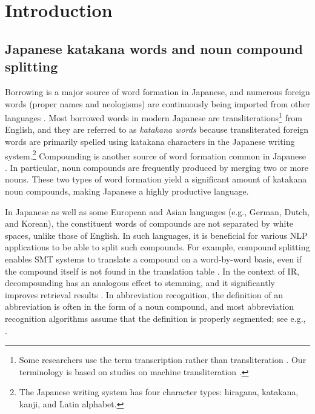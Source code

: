 \documentclass[english]{jnlp_1.4_rep}
\begin{document}
\maketitle

\section{Introduction} \label{sec:intro}

\subsection{Japanese katakana words and noun compound splitting}

Borrowing is a major source of word formation in Japanese, and numerous
foreign words (proper names and neologisms) are continuously being
imported from other languages \cite{Tsujimura06}. Most borrowed words in
modern Japanese are transliterations\footnote{Some researchers use the term transcription rather
than transliteration \cite{Breen09}. Our terminology is based on studies
on machine transliteration \cite{Knight98}.} 
from English, and they are referred to as {\it katakana words} because
transliterated foreign words are primarily spelled using katakana
characters in the Japanese writing system.\footnote{The Japanese writing system has four character types:
hiragana, katakana, kanji, and Latin alphabet.} 
Compounding is another source of word formation common in Japanese \cite{Tsujimura06}. 
In particular, noun compounds are frequently
produced by merging two or more nouns. These two types of word
formation yield a significant amount of katakana noun compounds, making
Japanese a highly productive language.

In Japanese as well as some European and Asian languages (e.g., German,
Dutch, and 
\linebreak
Korean), the constituent words of compounds are not separated by
white spaces, unlike those of English. In such languages, it is beneficial for
various NLP applications to be able to split such compounds. For example, compound
splitting enables SMT systems to translate a compound on a word-by-word
basis, even if the compound itself is not found in the translation table
\cite{Koehn03,Dyer09}. In the context of IR, decompounding has an
analogous effect to stemming, and it significantly improves retrieval
results \cite{Braschler04}. In abbreviation recognition, the definition
of an abbreviation is often in the form of a noun compound, and most
abbreviation recognition algorithms assume that the definition is
properly segmented; see e.g., \cite{Schwartz03,Okazaki08}.
\end{document}
